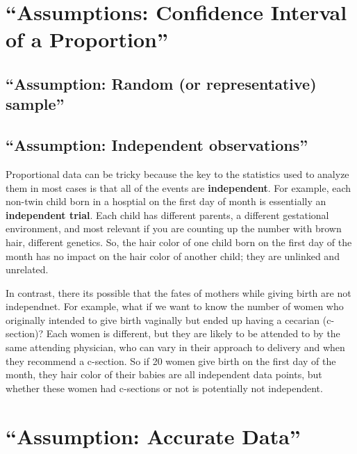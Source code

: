\documentclass[]{book}
\theoremstyle{definition}
\theoremstyle{definition}
\theoremstyle{definition}
\theoremstyle{remark}
\begin{document}
\section{\texorpdfstring{``Assumptions: Confidence Interval of a
Proportion''}{Assumptions: Confidence Interval of a Proportion}}\label{assumptions-confidence-interval-of-a-proportion}

\subsection{\texorpdfstring{``Assumption: Random (or representative)
sample''}{Assumption: Random (or representative) sample}}\label{assumption-random-or-representative-sample}

\subsection{\texorpdfstring{``Assumption: Independent
observations''}{Assumption: Independent observations}}\label{assumption-independent-observations}

Proportional data can be tricky because the key to the statistics used
to analyze them in most cases is that all of the events are
\textbf{independent}. For example, each non-twin child born in a
hosptial on the first day of month is essentially an \textbf{independent
trial}. Each child has different parents, a different gestational
environment, and most relevant if you are counting up the number with
brown hair, different genetics. So, the hair color of one child born on
the first day of the month has no impact on the hair color of another
child; they are unlinked and unrelated.

In contrast, there its possible that the fates of mothers while giving
birth are not independnet. For example, what if we want to know the
number of women who originally intended to give birth vaginally but
ended up having a cecarian (c-section)? Each women is different, but
they are likely to be attended to by the same attending physician, who
can vary in their approach to delivery and when they recommend a
c-section. So if 20 women give birth on the first day of the month, they
hair color of their babies are all independent data points, but whether
these women had c-sections or not is potentially not independent.

\section{\texorpdfstring{``Assumption: Accurate
Data''}{Assumption: Accurate Data}}\label{assumption-accurate-data}
\end{document}
